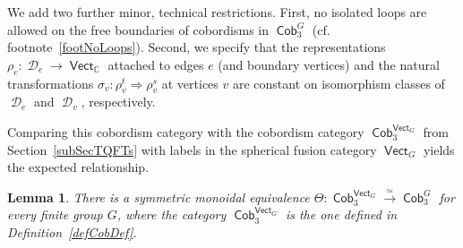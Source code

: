 \documentclass[pdftex]{sigma}
\DeclareMathOperator{\vect}{\mathsf{Vect}}
\DeclareMathOperator{\C}{\mathbb{C}}
\DeclareMathOperator{\Cob}{\mathsf{Cob}}
\DeclareMathOperator{\cald}{\mathcal{D}}
\numberwithin{equation}{section}
\newtheorem{Lemma}[Lemma]{Lemma}
\theoremstyle{definition}
\begin{document}
We add two further minor, technical restrictions.
First, no isolated loops are allowed on the free boundaries of cobordisms in $\Cob_3^G$ (cf. footnote~\ref{footNoLoops}). Second, we specify that the representations $\rho_e \colon \cald_e \rightarrow \vect_{\C}$ attached to edges $e$ (and boundary vertices) and the natural transformations $\sigma_v \colon \rho_v^t \Rightarrow \rho_v^s$ at vertices $v$ are constant on isomorphism classes of $\cald_e$ and $\cald_v$, respectively.

Comparing this cobordism category with the cobordism category $\Cob_3^{\vect_G}$ from Section~\ref{subSecTQFTs} with labels in the spherical fusion category $\vect_G$ yields the expected relationship.
\begin{Lemma}\label{lemEqCob}
 There is a symmetric monoidal equivalence $\Theta\colon \Cob_3^{\vect_G} \xrightarrow{\simeq} \Cob_3^G$ for every finite group $G$, where the category $\Cob_3^{\vect_G}$ is the one defined in Definition~{\rm \ref{defCobDef}}.
\end{Lemma}
\end{document}
